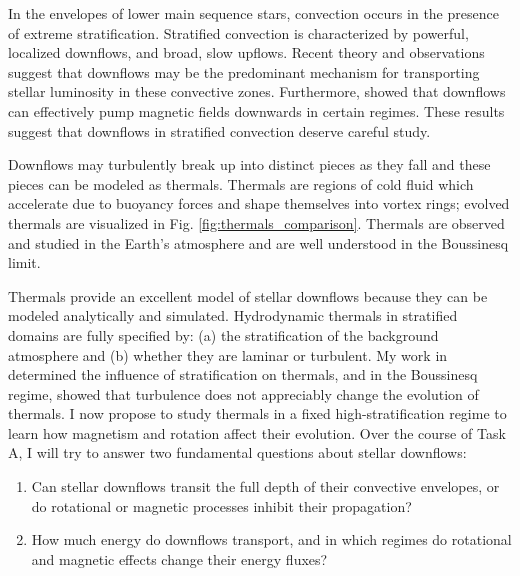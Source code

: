 \documentclass[11pt, preprint]{aastex}
\begin{document}
In the envelopes of lower main sequence stars, convection occurs in the presence of extreme stratification.
Stratified convection is characterized by powerful, localized downflows, and broad, slow upflows.
Recent theory and observations \citep[e.g.,][]{hanasoge&all2015, brandenburg2016, kapyla&all2017, andersLB2019} suggest that downflows may be the predominant mechanism for transporting stellar luminosity in these convective zones.
Furthermore, \citet{tobias&all1998} showed that downflows can effectively pump magnetic fields downwards in certain regimes.
These results suggest that downflows in stratified convection deserve careful study.

Downflows may turbulently break up into distinct pieces as they fall and these pieces can be modeled as thermals.
Thermals are regions of cold fluid which accelerate due to buoyancy forces and shape themselves into vortex rings; evolved thermals are visualized in Fig. \ref{fig:thermals_comparison}.
Thermals are observed and studied in the Earth's atmosphere and are well understood in the Boussinesq limit.

Thermals provide an excellent model of stellar downflows because they can be modeled analytically and simulated.
Hydrodynamic thermals in stratified domains are fully specified by: (a) the stratification of the background atmosphere and (b) whether they are laminar or turbulent.
My work in \citet{andersLB2019} determined the influence of stratification on thermals, and in the Boussinesq regime, \citet{lecoanet&jeevanjee2019} showed that turbulence does not appreciably change the evolution of thermals.
I now propose to study thermals in a fixed high-stratification regime to learn how magnetism and rotation affect their evolution.
Over the course of Task A, I will try to answer two fundamental questions about stellar downflows:
\vspace{-16pt}
\begin{enumerate}
\item Can stellar downflows transit the full depth of their convective envelopes, or do rotational or magnetic processes inhibit their propagation?
\vspace{-10pt}
\item How much energy do downflows transport, and in which regimes do rotational and magnetic effects change their energy fluxes?
\vspace{-10pt}
\end{enumerate}
\end{document}
